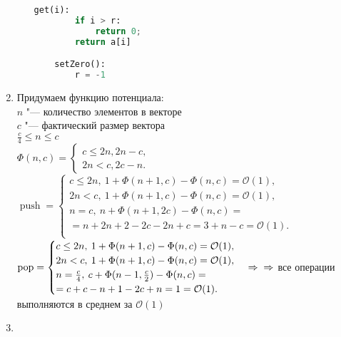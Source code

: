 \documentclass[a4paper, 11pt]{article}
\begin{document}
\begin{enumerate}
\begin{enumerate}
\begin{lstlisting}[language=Python]
	get(i):
		if i > r:
			return 0; 
		return a[i]

	setZero():
		r = -1
	\end{lstlisting}
\end{enumerate}

\item
\begin{enumerate}
	Придумаем функцию потенциала:\\
	$n$ "--- количество элементов в векторе\\
	$c$ "--- фактический размер вектора \\
	$\frac{c}{4} \leq n \leq c$\\
	$\Phi(n, c) = \begin{cases}
		c \leq 2n, 2n - c,\\
		2n < c, 2c - n.
	\end{cases}$\\
	$\operatorname{push} = \begin{cases}
		c \leq 2n, \medspace 1 + \Phi(n + 1, c) - \Phi(n, c) = \mathcal{O}(1),\\
		2n < c, \medspace 1 + \Phi(n + 1, c) - \Phi(n, c) = \mathcal{O}(1),\\
		n = c, \medspace n + \Phi(n + 1, 2c) - \Phi(n, c) =\\
		= n + 2n + 2 - 2c - 2n + c = 3 + n - c = \mathcal{O}(1).\\
	\end{cases}$\\
	$\operatorname{pop} = \begin{cases}
		c \leq 2n, \medspace 1 + \Phi(n + 1, c) - \Phi(n, c) = \mathcal{O}(1),\\
		2n < c, \medspace 1 + \Phi(n + 1, c) - \Phi(n, c) = \mathcal{O}(1),\\
		n = \frac{c}{4}, \medspace c + \Phi(n - 1, \frac{c}{2}) - \Phi(n, c) =\\
		= c + c - n + 1 - 2c + n = 1 = \mathcal{O}(1).\\
	\end{cases} \Rightarrow \\ \Rightarrow$ все операции выполняются в среднем за $\mathcal{O}(1)$ 
\end{enumerate}

\item
\begin{enumerate}

\end{enumerate}


\end{enumerate}
\end{document}
